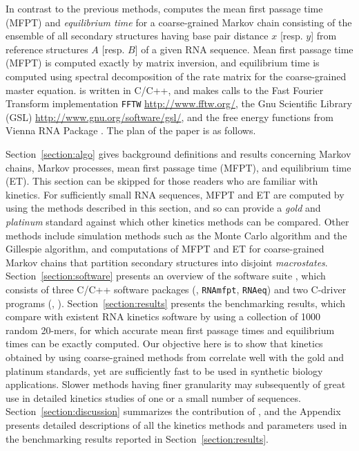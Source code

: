 In contrast to the previous methods, \hermes computes the mean
first passage time (MFPT) and {\em equilibrium time} for a
coarse-grained Markov chain consisting of the ensemble of all
secondary structures having base pair distance $x$ [resp. $y$] from
reference structures $A$ [resp. $B$] of a given RNA sequence.
Mean first passage time (MFPT) is computed exactly by matrix inversion,
and equilibrium time is computed using spectral decomposition of the rate
matrix for the coarse-grained master equation.
\hermes is written in C/C++, and
makes calls to the Fast Fourier Transform implementation {\tt FFTW}
\cite{FFTW05} \url{http://www.fftw.org/}, the Gnu Scientific Library
(GSL) \url{http://www.gnu.org/software/gsl/}, and the free energy
functions from Vienna RNA Package \cite{Lorenz.amb11}. The plan of the
paper is as follows.

Section~\ref{section:algo} gives background definitions and results
concerning Markov chains, Markov processes, mean first passage time (MFPT),
and equilibrium time (ET). This section can be skipped for those readers
who are familiar with kinetics. For sufficiently small RNA sequences, MFPT and
ET are computed by \hermes using the methods described in this section,
and so can provide a {\em gold} and {\em platinum} standard against which
other kinetics methods can be compared. Other methods include
simulation methods such as the Monte Carlo algorithm and the Gillespie
algorithm, and computations of MFPT and ET for coarse-grained Markov
chains that partition secondary structures into disjoint {\em macrostates}.
Section~\ref{section:software} presents an overview of the software suite
\hermes, which consists of three C/C++ software packages
(\ffttwo, {\tt RNAmfpt}, {\tt RNAeq}) and two C-driver programs
(\fftmfpt, \ffteq).
Section~\ref{section:results} presents the benchmarking results,
which compare \hermes with
existent RNA kinetics software by using a collection of 1000
random 20-mers, for which accurate mean first passage times and equilibrium
times can be exactly computed. Our objective here is to show that kinetics
obtained by using coarse-grained methods from \hermes correlate well
with the gold and platinum standards, yet are sufficiently fast to be used
in synthetic biology applications. Slower methods having finer granularity
may subsequently of great use in detailed kinetics studies of one or
a small number of sequences.
Section~\ref{section:discussion} summarizes the contribution
of \hermes, and the Appendix presents detailed descriptions of
all the kinetics methods and parameters used in the benchmarking results
reported in Section~\ref{section:results}.



